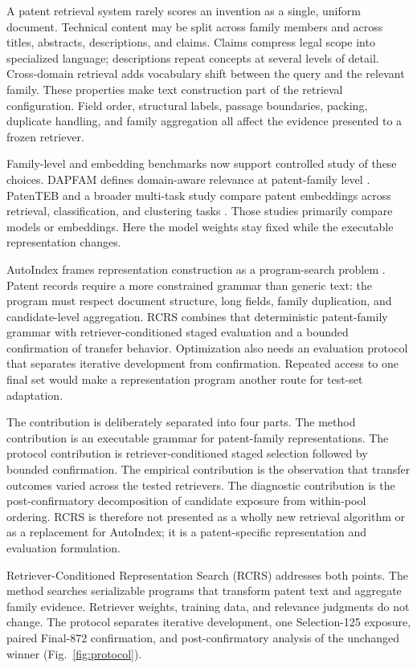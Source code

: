 \documentclass[final,5p,times,twocolumn]{elsarticle}
\newcommand{\RCRS}{RCRS}
\begin{document}
A patent retrieval system rarely scores an invention as a single, uniform
document. Technical content may be split across family members and across
titles, abstracts, descriptions, and claims. Claims compress legal scope into
specialized language; descriptions repeat concepts at several levels of
detail. Cross-domain retrieval adds vocabulary shift between the query and the
relevant family. These properties make text construction part of the retrieval
configuration. Field order, structural labels, passage boundaries, packing,
duplicate handling, and family aggregation all affect the evidence presented
to a frozen retriever.

Family-level and embedding benchmarks now support controlled study of these
choices. DAPFAM defines domain-aware relevance at patent-family level
\cite{dapfam2026}. PatenTEB and a broader multi-task study compare patent
embeddings across retrieval, classification, and clustering tasks
\cite{patenteb2025,patentembeddings2026}. Those studies primarily compare
models or embeddings. Here the model weights stay fixed while the executable
representation changes.

AutoIndex frames representation construction as a program-search problem
\cite{autoindex2026}. Patent records require a more constrained grammar than
generic text: the program must respect document structure, long fields,
family duplication, and candidate-level aggregation. RCRS combines that
deterministic patent-family grammar with retriever-conditioned staged
evaluation and a bounded confirmation of transfer behavior. Optimization also
needs an evaluation protocol that separates iterative development from
confirmation.
Repeated access to one final set would make a representation program another
route for test-set adaptation.

The contribution is deliberately separated into four parts. The method
contribution is an executable grammar for patent-family representations. The
protocol contribution is retriever-conditioned staged selection followed by
bounded confirmation. The empirical contribution is the observation that
transfer outcomes varied across the tested retrievers. The diagnostic contribution is
the post-confirmatory decomposition of candidate exposure from within-pool
ordering. RCRS is therefore not presented as a wholly new retrieval algorithm
or as a replacement for AutoIndex; it is a patent-specific representation and
evaluation formulation.

Retriever-Conditioned Representation Search (\RCRS{}) addresses both points.
The method searches serializable
programs that transform patent text and aggregate family evidence. Retriever
weights, training data, and relevance judgments do not change. The protocol
separates iterative development, one Selection-125 exposure, paired Final-872
confirmation, and post-confirmatory analysis of the unchanged winner
(Fig.~\ref{fig:protocol}).
\end{document}
